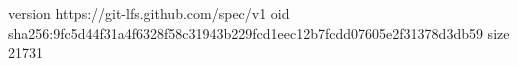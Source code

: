 version https://git-lfs.github.com/spec/v1
oid sha256:9fc5d44f31a4f6328f58c31943b229fcd1eec12b7fcdd07605e2f31378d3db59
size 21731
